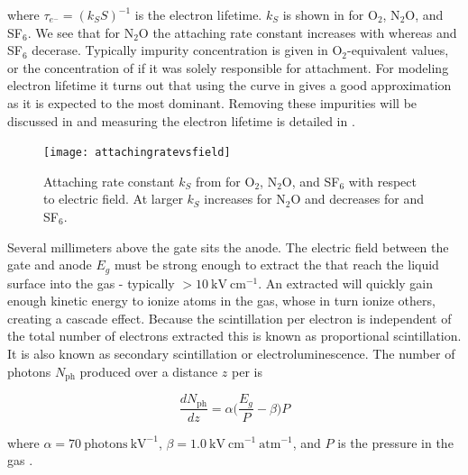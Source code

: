 \noindent where $\tau_{e^-} = (k_{S}S)^{-1}$ is the electron lifetime.  $k_{S}$ is shown in  for
O$_{2}$,
N$_{2}$O, and SF$_{6}$.  We see that for N$_{2}$O the attaching rate constant increases with \efield whereas \otwo and SF$_{6}$
decerase.  Typically impurity concentration is given in O$_{2}$-equivalent values, or the concentration of \otwo if it was solely
responsible for \electron attachment.  For modeling electron lifetime it turns out that using the \otwo curve in
 gives a good approximation as it is expected to the most dominant.  Removing these
impurities will be discussed in  and measuring the electron lifetime is detailed in
.

\begin{figure}
\texttt{[image: attachingratevsfield]}
\caption{Attaching rate constant $k_{S}$ from  for O$_{2}$, N$_{2}$O, and SF$_{6}$ with respect to electric field.  At
larger \efields $k_{S}$ increases for N$_{2}$O and decreases for \otwo and SF$_{6}$.}
\label{fig:attachment_rate}
\end{figure}

Several millimeters above the gate sits the anode.  The electric field between the gate and anode $E_{g}$ must be strong
enough to extract the \electron that reach the liquid surface into the gas - typically $> 10\ \mathrm{kV\ cm^{-1}}$.  An extracted
\electron will quickly gain enough kinetic energy to ionize atoms in the gas,
whose \electron in turn ionize others, creating a cascade effect.  Because the scintillation per electron is independent of
the total number of electrons extracted this is known as proportional scintillation.  It is also known as secondary scintillation or
electroluminescence.  The number of photons $N_{\mathrm{ph}}$ produced over a distance $z$ per \electron is

\begin{equation}
\frac{dN_{\mathrm{ph}}}{dz} = \alpha \Big( \frac{E_{g}}{P} - \beta \Big) P
\label{eq:electronlum}
\end{equation}

\noindent where $\alpha = 70\ \mathrm{photons\ kV^{-1}}$, $\beta = 1.0\ \mathrm{kV\ cm^{-1}\ atm^{-1}}$, and $P$ is the pressure in the
gas .

